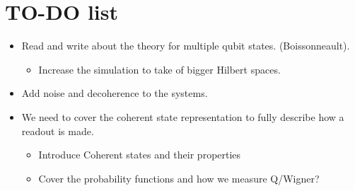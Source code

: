 \chapter*{TO-DO list }
\begin{itemize}
    \item Read and write about the theory for multiple qubit states. (Boissonneault).
    \begin{itemize}
        \item Increase the simulation to take of bigger Hilbert spaces.
    \end{itemize}
    \item Add noise and decoherence to the systems.
    \item We need to cover the coherent state representation to fully describe how a readout is made. 
    \begin{itemize}
        \item Introduce Coherent states and their properties
        \item Cover the probability functions and how we measure Q/Wigner? 
    \end{itemize}


\end{itemize}
